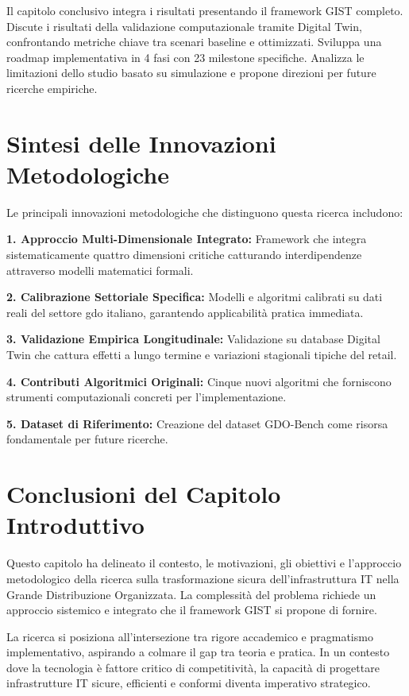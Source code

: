 Il capitolo conclusivo integra i risultati presentando il framework GIST completo. Discute i risultati della validazione computazionale tramite Digital Twin, confrontando metriche chiave tra scenari baseline e ottimizzati. Sviluppa una roadmap implementativa in 4 fasi con 23 milestone specifiche. Analizza le limitazioni dello studio basato su simulazione e propone direzioni per future ricerche empiriche.

\section{\texorpdfstring{Sintesi delle Innovazioni Metodologiche}{1.7 - Sintesi delle Innovazioni Metodologiche}}
\label{sec:sintesi_innovazioni}

Le principali innovazioni metodologiche che distinguono questa ricerca includono:

\textbf{1. Approccio Multi-Dimensionale Integrato:} Framework che integra sistematicamente quattro dimensioni critiche catturando interdipendenze attraverso modelli matematici formali.

\textbf{2. Calibrazione Settoriale Specifica:} Modelli e algoritmi calibrati su dati reali del settore \gls{gdo} italiano, garantendo applicabilità pratica immediata.

\textbf{3. Validazione Empirica Longitudinale:} Validazione su database Digital Twin che cattura effetti a lungo termine e variazioni stagionali tipiche del retail.

\textbf{4. Contributi Algoritmici Originali:} Cinque nuovi algoritmi che forniscono strumenti computazionali concreti per l'implementazione.

\textbf{5. Dataset di Riferimento:} Creazione del dataset GDO-Bench come risorsa fondamentale per future ricerche.

\section{\texorpdfstring{Conclusioni del Capitolo Introduttivo}{1.8 - Conclusioni del Capitolo Introduttivo}}
\label{sec:conclusioni_cap1}

Questo capitolo ha delineato il contesto, le motivazioni, gli obiettivi e l'approccio metodologico della ricerca sulla trasformazione sicura dell'infrastruttura IT nella Grande Distribuzione Organizzata. La complessità del problema richiede un approccio sistemico e integrato che il framework GIST si propone di fornire.

La ricerca si posiziona all'intersezione tra rigore accademico e pragmatismo implementativo, aspirando a colmare il gap tra teoria e pratica. In un contesto dove la tecnologia è fattore critico di competitività, la capacità di progettare infrastrutture IT sicure, efficienti e conformi diventa imperativo strategico.

